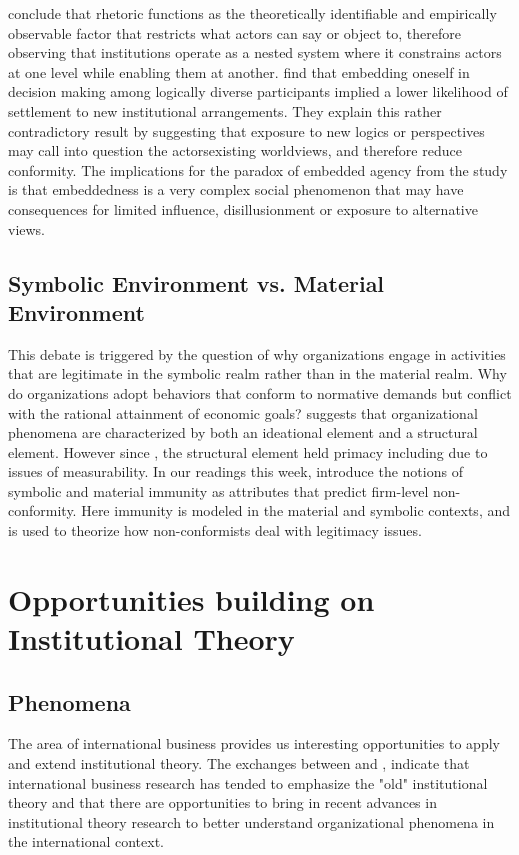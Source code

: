 \documentclass[12pt]{article}
\begin{document}
\cite{Harmon2015} conclude that rhetoric functions as the theoretically identifiable and empirically observable factor that restricts what actors can say or object to, therefore observing that institutions operate as a nested system where it constrains actors at one level while enabling them at another. \cite{Helms2012} find that embedding oneself in decision making among logically diverse participants implied a lower likelihood of settlement to new institutional arrangements. They explain this rather contradictory result by suggesting that exposure to new logics or perspectives may call into question the actors\textquotesingle existing worldviews, and therefore reduce conformity. The implications for the paradox of embedded agency from the \cite{Helms2012} study is that embeddedness is a very complex social phenomenon that  may have consequences for limited influence, disillusionment or exposure to alternative views.

\subsection{Symbolic Environment vs. Material Environment}
This debate is triggered by the question of why organizations engage in activities that are legitimate in the symbolic realm rather than in the material realm. Why do organizations adopt behaviors that conform to normative demands but conflict with the rational attainment of economic goals? \cite{Suddaby2010} suggests that organizational phenomena are characterized by both an ideational element and a structural element. However since \cite{Dimaggio1983},  the structural element held primacy including due to issues of measurability. In our readings this week, \cite{Lepoutre2012} introduce the notions of symbolic and material immunity as attributes that predict firm-level non-conformity. Here immunity is modeled in the material and symbolic contexts, and is used to theorize how non-conformists deal with legitimacy issues.

\section{Opportunities building on Institutional Theory}
\subsection{Phenomena}
The area of international business provides us interesting opportunities to apply and extend institutional theory. The exchanges between \cite{Kostova2008} and \cite{Philips2009}, indicate that international business research has tended to emphasize the "old" institutional theory and that there are opportunities to bring in recent advances in institutional theory research to better understand organizational phenomena in the international context. 
\end{document}
